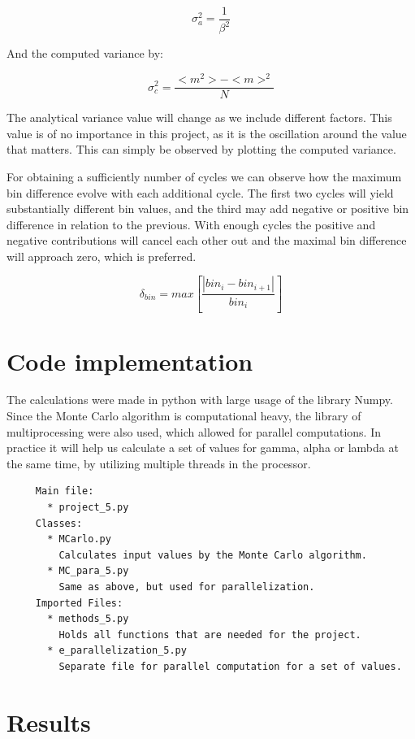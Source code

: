 \documentclass[a4paper,11pt]{article}
\begin{document}
\begin{equation}
\sigma^2_a = \frac{1}{\beta^2}
\end{equation}

And the computed variance by:

\begin{equation}
\sigma^2_c = \frac{<m^2>-<m>^2}{N}
\end{equation}

The analytical variance value will change as we include different factors. This value is of no importance in this project, as it is the oscillation around the value that matters. This can simply be observed by plotting the computed variance.
\\
\par
For obtaining a sufficiently number of cycles we can observe how the maximum bin difference evolve with each additional cycle. The first two cycles will yield substantially different bin values, and the third may add negative or positive bin difference in relation to the previous. With enough cycles the positive and negative contributions will cancel each other out and the maximal bin difference will approach zero, which is preferred.

\begin{equation}
\delta_{bin} = max[\frac{|bin_i-bin_{i+1}|}{bin_i}]
\end{equation}

\section{Code implementation}
The calculations were made in python with large usage of the library Numpy. Since the Monte Carlo algorithm is computational heavy, the library
of multiprocessing were also used, which allowed for parallel computations.
In practice it will help us calculate a set of values for gamma, alpha or lambda at the same time, by utilizing multiple threads in the processor.
\begin{verbatim}
     Main file:
       * project_5.py
     Classes:
       * MCarlo.py
         Calculates input values by the Monte Carlo algorithm.
       * MC_para_5.py
         Same as above, but used for parallelization.
     Imported Files:
       * methods_5.py
         Holds all functions that are needed for the project.
       * e_parallelization_5.py
         Separate file for parallel computation for a set of values.
\end{verbatim}


\section{Results}
\end{document}
